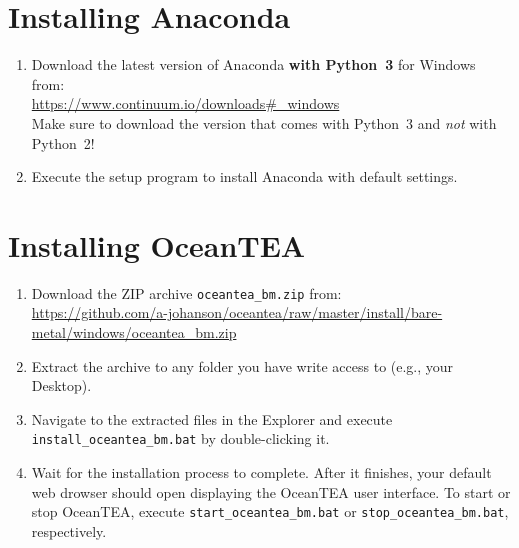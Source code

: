 \documentclass[11pt,a4paper,english,oneside,parskip=false]{scrartcl} %
\begin{document}
\section{Installing Anaconda} \label{sec:anaconda}

\begin{enumerate}
	\item Download the latest version of Anaconda \textbf{with Python~3} for Windows from:\\
	\url{https://www.continuum.io/downloads#_windows}\\
	Make sure to download the version that comes with Python~3 and \emph{not} with Python~2!
	\item Execute the setup program to install Anaconda with default settings. 
\end{enumerate}




\section{Installing OceanTEA} \label{sec:oceantea}

\begin{enumerate}
	\item Download the ZIP archive \texttt{oceantea\_bm.zip} from:\\
	\url{https://github.com/a-johanson/oceantea/raw/master/install/bare-metal/windows/oceantea_bm.zip}
	\item Extract the archive to any folder you have write access to (e.g., your Desktop).
	\item Navigate to the extracted files in the Explorer and execute \texttt{install\_oceantea\_bm.bat} by double\hyp{}clicking it.
	\item Wait for the installation process to complete. After it finishes, your default web drowser should open displaying the OceanTEA user interface. 
	To start or stop OceanTEA, execute \texttt{start\_oceantea\_bm.bat} or \texttt{stop\_oceantea\_bm.bat}, respectively.
\end{enumerate}
\end{document}
